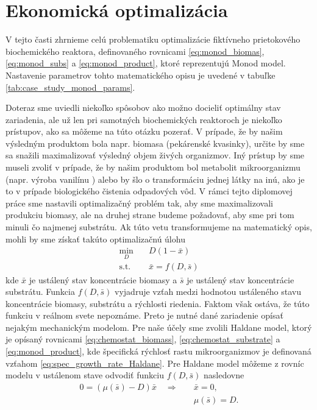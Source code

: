 \section{Ekonomická optimalizácia}
V tejto časti zhrnieme celú problematiku optimalizácie fiktívneho prietokového biochemického reaktora, definovaného rovnicami \eqref{eq:monod_biomas}, \eqref{eq:monod_subs} a \eqref{eq:monod_product}, ktoré reprezentujú Monod model. Nastavenie parametrov tohto matematického opisu je uvedené v tabuľke \ref{tab:case_study_monod_params}.

Doteraz sme uviedli niekoľko spôsobov ako možno docieliť optimálny stav zariadenia, ale už len pri samotných biochemických reaktoroch je niekoľko prístupov, ako sa môžeme na túto otázku pozerať. V prípade, že by našim výsledným produktom bola napr. biomasa (pekárenské kvasinky), určite by sme sa snažili maximalizovať výsledný objem živých organizmov. Iný prístup by sme museli zvoliť v prípade, že by našim produktom bol metabolit mikroorganizmu (napr. výroba vanilínu \cite{hansen:vanilin_biosyn:2009}) alebo by šlo o transformáciu jednej látky na inú, ako je to v prípade biologického čistenia odpadových vôd. V rámci tejto diplomovej práce sme nastavili optimalizačný problém tak, aby sme maximalizovali produkciu biomasy, ale na druhej strane budeme požadovať, aby sme pri tom minuli čo najmenej substrátu. Ak túto vetu transformujeme na matematický opis, mohli by sme získať takúto optimalizačnú úlohu
\begin{equation}
	\label{eq:chemostat_opt1}
	\begin{split}
		\min_{D} &\quad D\left(1-\bar{x}\right) \\
		\text{s.t.} &\quad \bar{x} = f(D,\bar{s})
	\end{split}
\end{equation}
kde $ \bar{x} $ je ustálený stav koncentrácie biomasy a $ \bar{s} $ je ustálený stav koncentrácie substrátu. Funkcia $ f(D,\bar{s}) $ vyjadruje vzťah medzi hodnotou ustáleného stavu koncentrácie biomasy, substrátu a rýchlosti riedenia. Faktom však ostáva, že túto funkciu v reálnom svete nepoznáme. Preto je nutné dané zariadenie opísať nejakým mechanickým modelom. Pre naše účely sme zvolili Haldane model, ktorý je opísaný rovnicami \eqref{eq:chemostat_biomass}, \eqref{eq:chemostat_substrate} a \eqref{eq:monod_product}, kde špecifická rýchlosť rastu mikroorganizmov je definovaná vzťahom \eqref{eq:spec_growth_rate_Haldane}. Pre Haldane model môžeme z rovníc modelu v ustálenom stave odvodiť funkciu $ f(D,\bar{s}) $ nasledovne
\begin{align*}
	0 = \left(\mu(\bar{s})-D\right)\bar{x} \quad \Longrightarrow \quad &\bar{x}=0, \\
	&\mu(\bar{s})=D.
\end{align*}
